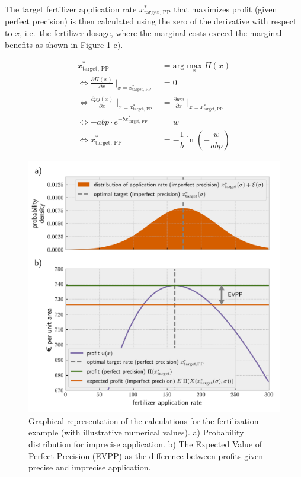 The target fertilizer application rate $x^\ast_\text{target, PP}$ that maximizes profit (given perfect precision) is then calculated using the zero of the derivative with respect to $x$, i.e.~the fertilizer dosage, where the marginal costs exceed the marginal benefits as shown in Figure 1 c).

\begin{align}
x^\ast_\text{target, PP} &= \text{arg}\max_x \Pi(x) \\
\iff \frac{\partial \Pi(x)}{\partial x} \mid_{x = x^\ast_\text{target, PP}} &= 0\\
\iff \frac{\partial py(x)}{\partial x} \mid_{x = x^\ast_\text{target, PP}} &= \frac{\partial wx}{\partial x} \mid_{x = x^\ast_\text{target, PP}}\\
\iff -abp \cdot e^{-bx^\ast_\text{target, PP}} &= w\\
\iff x^\ast_\text{target, PP} &=  -\dfrac{1}{b} \ln\left(-\dfrac{w}{abp}\right)
\end{align}

\begin{figure}
\centering
\includegraphics{imgs/synplot2.png}
\caption{Graphical representation of the calculations for the fertilization example (with illustrative numerical values). a) Probability distribution for imprecise application. b) The Expected Value of Perfect Precision (EVPP) as the difference between profits given precise and imprecise application.}
\end{figure}

